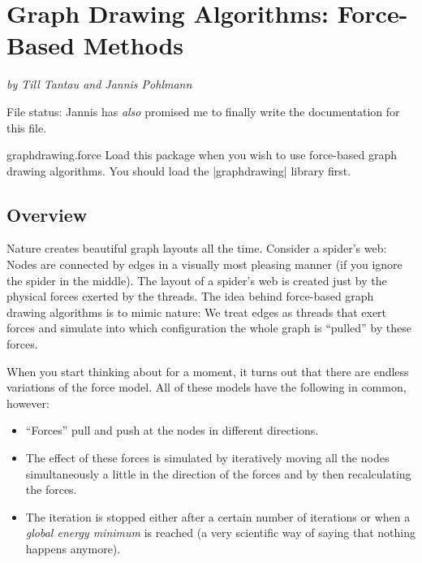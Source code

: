 %
%
%

\section{Graph Drawing Algorithms: Force-Based Methods}
\label{section-library-graphdrawing-force-based}
\label{section-last-graphdrawing-library-in-manual}

{\emph{by Till Tantau and Jannis Pohlmann}}


File status: Jannis has \emph{also} promised me to finally write the
documentation for this file.

\begin{tikzlibrary}{graphdrawing.force}
  Load this package when you wish to use force-based graph drawing
  algorithms. You should load the |graphdrawing| library first.
\end{tikzlibrary}



\subsection{Overview}

Nature creates beautiful graph layouts all the time. Consider a
spider's web: Nodes are connected by edges in a visually most pleasing
manner (if you ignore the spider in the middle). The layout of a
spider's web is created just by the physical forces exerted by the
threads. The idea behind force-based graph drawing algorithms is to
mimic nature: We treat edges as threads that exert forces and simulate
into which configuration the whole graph is ``pulled'' by these
forces.

When you start thinking about for a moment, it turns out that there
are endless variations of the force model. All of these models have
the following in common, however:
\begin{itemize}
\item ``Forces'' pull and push at the nodes in different
  directions.
\item The effect of these forces is simulated by iteratively moving
  all the nodes simultaneously a little in the direction of the forces
  and by then recalculating the forces.
\item The iteration is stopped either after a certain number of
  iterations or when a \emph{global energy minimum} is reached (a very
  scientific way of saying that nothing happens anymore). 
\end{itemize}

